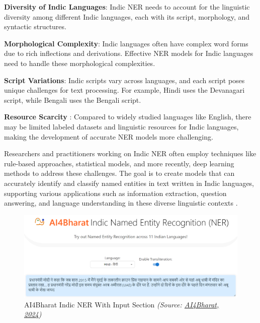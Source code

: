 \textbf{Diversity of Indic Languages}: Indic NER needs to account for the linguistic diversity among different Indic languages, each with its script, morphology, and syntactic structures.

\textbf{Morphological Complexity}: Indic languages often have complex word forms due to rich inflections and derivations. Effective NER models for Indic languages need to handle these morphological complexities.

\textbf{Script Variations}: Indic scripts vary across languages, and each script poses unique challenges for text processing. For example, Hindi uses the Devanagari script, while Bengali uses the Bengali script.

\textbf{Resource Scarcity} : Compared to widely studied languages like English, there may be limited labeled datasets and linguistic resources for Indic languages, making the development of accurate NER models more challenging.

Researchers and practitioners working on Indic NER often employ techniques like rule-based approaches, statistical models, and more recently, deep learning methods to address these challenges. The goal is to create models that can accurately identify and classify named entities in text written in Indic languages, supporting various applications such as information extraction, question answering, and language understanding in these diverse linguistic contexts \cite{mhaske2022naamapadam}.

\vspace{10pt}

\begin{figure}[H]
\centering
\includegraphics [scale=0.44 ]{img/ai4bharat/ai4bharat.png}
\caption[AI4Bharat
Indic NER With Input Section]{AI4Bharat Indic NER With Input Section \textit{(Source: \href{https://ai4bharat.iitm.ac.in/}{AI4Bharat, 2024})}}
\label{fig:DisplaCy.png}

\end{figure}

